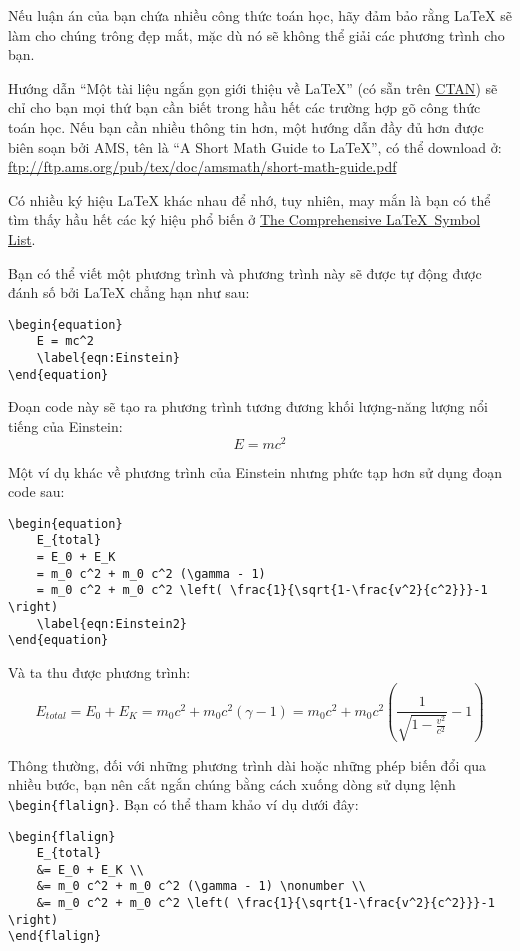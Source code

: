 Nếu luận án của bạn chứa nhiều công thức toán học, hãy đảm bảo rằng \LaTeX{} sẽ làm cho chúng trông đẹp mắt, mặc dù nó sẽ không thể giải các phương trình cho bạn.

Hướng dẫn \enquote{Một tài liệu ngắn gọn giới thiệu về \LaTeX} (có sẵn trên \href{https://mirror.kku.ac.th/CTAN/info/lshort/vietnamese/lshort-vi.pdf}{CTAN}) sẽ chỉ cho bạn mọi thứ bạn cần biết trong hầu hết các trường hợp gõ công thức toán học. Nếu bạn cần nhiều thông tin hơn, một hướng dẫn đầy đủ hơn được biên soạn bởi AMS, tên là \enquote{A Short Math Guide to \LaTeX}, có thể download ở:\\
\url{ftp://ftp.ams.org/pub/tex/doc/amsmath/short-math-guide.pdf}

Có nhiều ký hiệu \LaTeX{} khác nhau để nhớ, tuy nhiên, may mắn là bạn có thể tìm thấy hầu hết các ký hiệu phổ biến ở \href{http://ctan.org/pkg/comprehensive}{The Comprehensive \LaTeX~Symbol List}.

Bạn có thể viết một phương trình và phương trình này sẽ được tự động được đánh số bởi \LaTeX{} chẳng hạn như sau:
\begin{Verbatim}
\begin{equation}
	E = mc^2
	\label{eqn:Einstein}
\end{equation}
\end{Verbatim}

Đoạn code này sẽ tạo ra phương trình tương đương khối lượng-năng lượng nổi tiếng của Einstein:
\begin{equation}
	E = mc^2
	\label{eqn:Einstein}
\end{equation}

Một ví dụ khác về phương trình của Einstein nhưng phức tạp hơn sử dụng đoạn code sau:
\begin{Verbatim}
\begin{equation}
	E_{total} 
	= E_0 + E_K 
	= m_0 c^2 + m_0 c^2 (\gamma - 1)
	= m_0 c^2 + m_0 c^2 \left( \frac{1}{\sqrt{1-\frac{v^2}{c^2}}}-1 \right)
	\label{eqn:Einstein2}
\end{equation}
\end{Verbatim}


Và ta thu được phương trình:
\begin{equation}
	E_{total} 
	= E_0 + E_K 
	= m_0 c^2 + m_0 c^2 (\gamma - 1)
	= m_0 c^2 + m_0 c^2 \left( \frac{1}{\sqrt{1-\frac{v^2}{c^2}}}-1 \right)
	\label{eqn:Einstein2}
\end{equation}

Thông thường, đối với những phương trình dài hoặc những phép biến đổi qua nhiều bước, bạn nên cắt ngắn chúng bằng cách xuống dòng sử dụng lệnh \verb|\begin{flalign}|. Bạn có thể tham khảo ví dụ dưới đây:
\begin{Verbatim}
\begin{flalign}
	E_{total} 
	&= E_0 + E_K \\
	&= m_0 c^2 + m_0 c^2 (\gamma - 1) \nonumber \\
	&= m_0 c^2 + m_0 c^2 \left( \frac{1}{\sqrt{1-\frac{v^2}{c^2}}}-1 \right)
\end{flalign}
\end{Verbatim}

